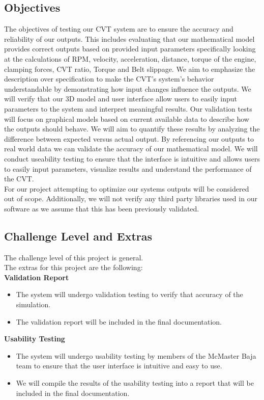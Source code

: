 \documentclass[12pt, titlepage]{article}
\begin{document}
\subsection{Objectives}

\noindent The objectives of testing our CVT system are to ensure the accuracy and reliability of our outputs. 
This includes evaluating that our mathematical model provides correct outputs based on provided input parameters specifically looking at the calculations of RPM, velocity, acceleration, distance, torque of the engine, clamping forces, CVT ratio, Torque and Belt slippage. 
We aim to emphasize the description over specification to make the CVT's system's behavior understandable by demonstrating how input changes influence the outputs.
We will verify that our 3D model and user interface allow users to easily input parameters to the system and interpret meaningful results. 
Our validation tests will focus on graphical models based on current available data to describe how the outputs should behave. 
We will aim to quantify these results by analyzing the difference between expected versus actual output. 
By referencing our outputs to real world data we can validate the accuracy of our mathematical model.
We will conduct useability testing to ensure that the interface is intuitive and allows users to easily input parameters, visualize results and understand the performance of the CVT.
\\
\noindent For our project attempting to optimize our systems outputs will be considered out of scope. 
Additionally, we will not verify any third party libraries used in our software as we assume that this has been previously validated. 

\subsection{Challenge Level and Extras}

The challenge level of this project is general.\\
\newline
The extras for this project are the following:\\
\textbf{Validation Report}
{\begin{itemize}
  \item The system will undergo validation testing to verify that accuracy of the simulation.
  \item The validation report will be included in the final documentation.
\end{itemize}}
{\noindent}
\textbf{Usability Testing}
{\begin{itemize}
  \item The system will undergo usability testing by members of the McMaster Baja team to ensure that
  the user interface is intuitive and easy to use.
  \item We will compile the results of the usability testing into a report that will be included in the final documentation.
\end{itemize}}
\end{document}
